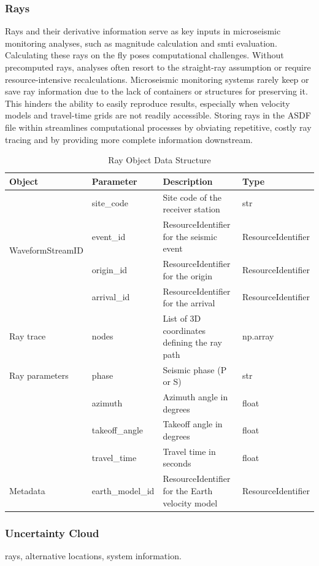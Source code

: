 \subsubsection{Rays}

Rays and their derivative information serve as key inputs in microseismic monitoring analyses, such as magnitude calculation and \gls{smti} evaluation. Calculating these rays on the fly poses computational challenges. Without precomputed rays, analyses often resort to the straight-ray assumption or require resource-intensive recalculations. Microseismic monitoring systems rarely keep or save ray information due to the lack of containers or structures for preserving it. This hinders the ability to easily reproduce results, especially when velocity models and travel-time grids are not readily accessible. Storing rays in the ASDF file within \muquake streamlines computational processes by obviating repetitive, costly ray tracing and by providing more complete information downstream.

\begin{table}[!h]
\centering
\caption{Ray Object Data Structure}
\begin{tabular}{|l|l|p{6cm}|l|}
\hline
\textbf{Object} & \textbf{Parameter} & \textbf{Description} & \textbf{Type} \\
\hline
\multirow{4}{4cm}{WaveformStreamID} & site\_code & Site code of the receiver station & str \\
                                    & event\_id & ResourceIdentifier for the seismic event & ResourceIdentifier \\
                                    & origin\_id & ResourceIdentifier for the origin & ResourceIdentifier \\
                                    & arrival\_id & ResourceIdentifier for the arrival & ResourceIdentifier \\
\hline
Ray trace & nodes & List of 3D coordinates defining the ray path & np.array \\
\hline
Ray parameters & phase & Seismic phase (P or S) & str \\
               & azimuth & Azimuth angle in degrees & float \\
               & takeoff\_angle & Takeoff angle in degrees & float \\
               & travel\_time & Travel time in seconds & float \\
\hline
Metadata & earth\_model\_id & ResourceIdentifier for the Earth velocity model & ResourceIdentifier \\
\hline
\end{tabular}
\end{table}








\subsubsection{Uncertainty Cloud}


rays, alternative locations, system information.



